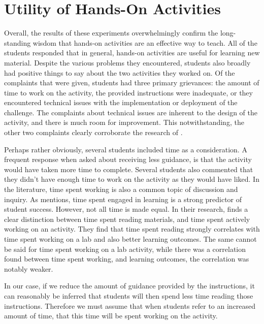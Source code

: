 \section{Utility of Hands-On Activities}
    Overall, the results of these experiments overwhelmingly confirm the long-standing wisdom that hands-on activities are an effective way to teach.  
    All of the students responded that in general, hands-on activities are useful for learning new material. Despite the various problems they encountered, students also broadly had positive things to say about the two activities they worked on. 
    Of the complaints that were given, students had three primary grievances: the amount of time to work on the activity, the provided instructions were inadequate, or they encountered technical issues with the implementation or deployment of the challenge. 
    The complaints about technical issues are inherent to the design of the activity, and there is much room for improvement. 
    This notwithstanding, the other two complaints clearly corroborate the research of \citeauthor{J-Sweller}. 
    
    Perhaps rather obviously, several students included time as a consideration. 
    A frequent response when asked about receiving less guidance, is that the activity would have taken more time to complete. 
    Several students also commented that they didn't have enough time to work on the activity as they would have liked. 
    In the literature, time spent working is also a common topic of discussion and inquiry. As \textcite{C-Linehan} mentions, time spent engaged in learning is a strong predictor of student success. 
    However, not all time is made equal. 
    In their research, \textcite{Z-Zeng} finds a clear distinction between time spent reading materials, and time spent actively working on an activity. 
    They find that time spent reading strongly correlates with time spent working on a lab and also better learning outcomes. 
    The same cannot be said for time spent working on a lab activity, while there was a correlation found between time spent working, and learning outcomes, the correlation was notably weaker. 
    
    In our case, if we reduce the amount of guidance provided by the instructions, it can reasonably be inferred that students will then spend less time reading those instructions. 
    Therefore we must assume that when students refer to an increased amount of time, that this time will be spent working on the activity. 


